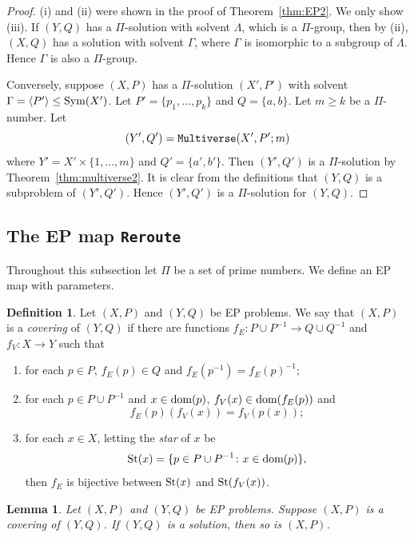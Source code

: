 \documentclass[11pt]{amsart}
\newtheorem{lemma}[theorem]{Lemma}
\theoremstyle{definition}
\newtheorem{definition}[theorem]{Definition}
\newcommand{\dom}{{\mbox{\rm dom}}}
\theoremstyle{definition}
\numberwithin{equation}{section}
\begin{document}
\begin{proof} (i) and (ii) were shown in the proof of Theorem~\ref{thm:EP2}. We only show (iii). If $(Y, Q)$ has a $\Pi$-solution with solvent $\Lambda$, which is a $\Pi$-group, then by (ii), $(X, Q)$ has a solution with solvent $\Gamma$, where $\Gamma$ is isomorphic to a subgroup of $\Lambda$. Hence $\Gamma$ is also a $\Pi$-group. 

Conversely, suppose $(X, P)$ has a $\Pi$-solution $(X', P')$ with solvent $\Gamma=\langle P'\rangle\leq \mbox{\rm Sym}(X')$. Let $P'=\{p_1,\dots, p_k\}$ and $Q=\{a, b\}$. Let $m\geq k$ be a $\Pi$-number. Let 
$$ (Y',Q')={\tt Multiverse}(X', P'; m) $$
where $Y'=X'\times\{1,\dots, m\}$ and $Q'=\{a',b'\}$. Then $(Y', Q')$ is a $\Pi$-solution by Theorem~\ref{thm:multiverse2}. It is clear from the definitions that $(Y, Q)$ is a subproblem of $(Y', Q')$. Hence $(Y', Q')$ is a $\Pi$-solution for $(Y, Q)$.
\end{proof}











\subsection{The EP map {\tt Reroute}} Throughout this subsection let $\Pi$ be a set of prime numbers. We define an EP map with parameters.


\begin{definition}\label{def:covering} Let $(X, P)$ and $(Y, Q)$ be EP problems. We say that $(X, P)$ is a {\em covering} of $(Y, Q)$ if there are functions $f_E\colon P\cup P^{-1}\to Q\cup Q^{-1}$ and $f_V\colon X\to Y$ such that 
\begin{enumerate}
\item[(i)] for each $p\in P$, $f_E(p)\in Q$ and $f_E(p^{-1})=f_E(p)^{-1}$;
\item[(ii)] for each $p\in P\cup P^{-1}$ and $x\in \dom(p)$, $f_V(x)\in \dom(f_E(p))$ and 
$$f_E(p)(f_V(x))=f_V(p(x));$$
\item[(iii)] for each $x\in X$, letting the {\em star} of $x$ be 
$$\mbox{\rm St}(x)=\{p\in P\cup P^{-1}\colon x\in\dom(p)\},$$ then $f_E$ is bijective between $\mbox{\rm St}(x)$ and $\mbox{\rm St}(f_V(x))$.
\end{enumerate}
\end{definition}

\begin{lemma}\label{lem:cov} Let $(X, P)$ and $(Y, Q)$ be EP problems. Suppose $(X, P)$ is a covering of $(Y,Q)$. If $(Y,Q)$ is a solution, then so is $(X, P)$.
\end{lemma}
\end{document}
